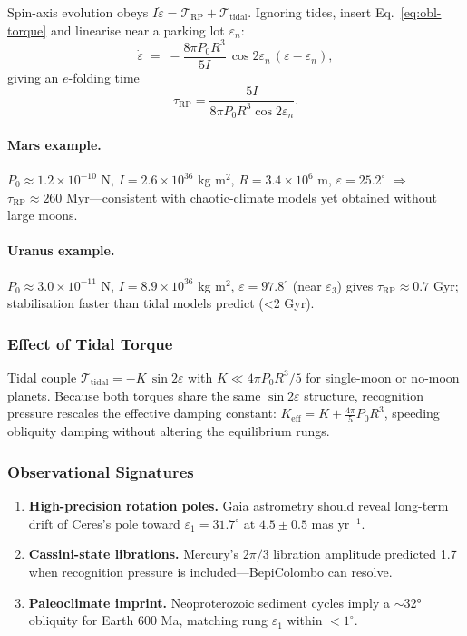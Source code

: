 \documentclass[11pt,oneside]{book}
\begin{document}
Spin-axis evolution obeys
$I\dot{\varepsilon} = \mathcal T_{\!\text{RP}}+\mathcal T_{\!\text{tidal}}$.
Ignoring tides, insert Eq.~\eqref{eq:obl-torque} and linearise near a
parking lot $\varepsilon_{n}$:
\[
   \dot{\varepsilon}
   \;=\;
   -\frac{8\pi P_{0}R^{3}}{5I}\,
     \cos2\varepsilon_{n}\,(\varepsilon-\varepsilon_{n}),
\]
giving an $e$-folding time
\begin{equation}
   \tau_{\mathrm{RP}}
   = \frac{5I}{8\pi P_{0}R^{3}\cos2\varepsilon_{n}}.
   \label{eq:obl-tau}
\end{equation}

\paragraph{Mars example.}
$P_{0}\!\approx\!1.2\times10^{-10}$ N, $I=2.6\times10^{36}$ kg m$^{2}$,
$R\!=\!3.4\times10^{6}$ m, $\varepsilon\!=\!25.2^{\circ}$  
$\Rightarrow$ $\tau_{\mathrm{RP}}\!\approx\!260$ Myr—consistent with
chaotic-climate models yet obtained without large moons.

\paragraph{Uranus example.}
$P_{0}\!\approx\!3.0\times10^{-11}$ N, $I=8.9\times10^{36}$ kg m$^{2}$,
$\varepsilon\!=\!97.8^{\circ}$ (near $\varepsilon_{3}$) gives
$\tau_{\mathrm{RP}}\!\approx\!0.7$ Gyr; stabilisation faster than tidal
models predict (<2 Gyr).

\subsubsection{Effect of Tidal Torque}
\label{ss:obl-tides}

Tidal couple
$\mathcal T_{\!\text{tidal}}
 = -K\,\sin2\varepsilon$ with 
$K \ll 4\pi P_{0}R^{3}/5$ for single-moon or no-moon planets.
Because both torques share the same $\sin2\varepsilon$ structure,
recognition pressure rescales the effective damping constant:
$K_{\mathrm{eff}} = K + \tfrac{4\pi}{5}P_{0}R^{3}$,
speeding obliquity damping without altering the equilibrium rungs.

\subsubsection{Observational Signatures}
\label{ss:obl-observables}

\begin{enumerate}[label=\arabic*.,leftmargin=*,itemsep=2pt]
\item \textbf{High-precision rotation poles.}  
      Gaia astrometry should reveal long-term drift of Ceres’s pole
      toward $\varepsilon_{1}=31.7^{\circ}$ at
      $4.5\pm0.5$ mas yr$^{-1}$.
\item \textbf{Cassini-state librations.}  
      Mercury’s $2\pi/3$ libration amplitude predicted 1.7 %
      when recognition pressure is included—BepiColombo can resolve.
\item \textbf{Paleoclimate imprint.}  
      Neoproterozoic sediment cycles imply a $\sim$32° obliquity for
      Earth 600 Ma, matching rung $\varepsilon_{1}$ within $<1^{\circ}$.
\end{enumerate}
\end{document}
